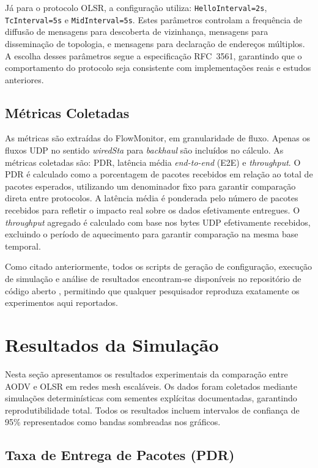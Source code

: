 \documentclass[12pt]{article}
\begin{document}
Já para o protocolo OLSR, a configuração utiliza: \texttt{HelloInterval=2s}, \texttt{TcInterval=5s} e \texttt{MidInterval=5s}. Estes parâmetros controlam a frequência de diffusão de mensagens para descoberta de vizinhança, mensagens para disseminação de topologia, e mensagens para declaração de endereços múltiplos. A escolha desses parâmetros segue a especificação RFC~3561, garantindo que o comportamento do protocolo seja consistente com implementações reais e estudos anteriores.

\subsection{Métricas Coletadas}

As métricas são extraídas do FlowMonitor, em granularidade de fluxo. Apenas os fluxos UDP no sentido \textit{wiredSta} para \textit{backhaul} são incluídos no cálculo. As métricas coletadas são: PDR, latência média \textit{end-to-end} (E2E) e \textit{throughput}. O PDR é calculado como a porcentagem de pacotes recebidos em relação ao total de pacotes esperados, utilizando um denominador fixo para garantir comparação direta entre protocolos. A latência média é ponderada pelo número de pacotes recebidos para refletir o impacto real sobre os dados efetivamente entregues. O \textit{throughput} agregado é calculado com base nos bytes UDP efetivamente recebidos, excluindo o período de aquecimento para garantir comparação na mesma base temporal.

Como citado anteriormente, todos os scripts de geração de configuração, execução de simulação e análise de resultados encontram-se disponíveis no repositório de código aberto \cite{caburlao_github}, permitindo que qualquer pesquisador reproduza exatamente os experimentos aqui reportados.

\section{Resultados da Simulação}\label{sec:results}

Nesta seção apresentamos os resultados experimentais da comparação entre AODV e OLSR em redes mesh escaláveis. Os dados foram coletados mediante simulações determinísticas com sementes explícitas documentadas, garantindo reprodutibilidade total. Todos os resultados incluem intervalos de confiança de 95\% representados como bandas sombreadas nos gráficos.

\subsection{Taxa de Entrega de Pacotes (PDR)}
\end{document}
